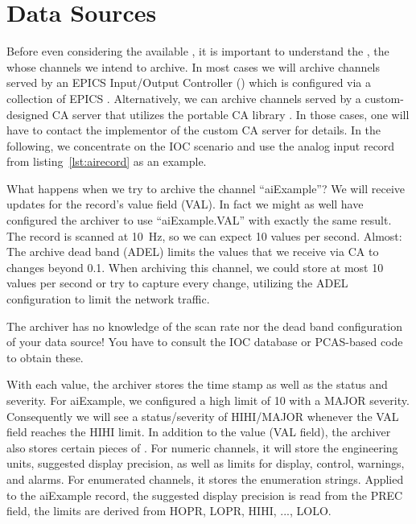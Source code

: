 \section{Data Sources} \label{sec:datasource} %
Before even considering the available , it is
important to understand the , the  whose channels we intend to archive.
In most cases we will archive channels served by an EPICS Input/Output
Controller () which is configured via a collection of EPICS
.
Alternatively, we can archive channels served by a custom-designed CA
server that utilizes the portable CA library .
In those cases, one will have to contact the implementor of the custom
CA server for details.
In the following, we concentrate on the IOC scenario and use the
analog input record from listing~\ref{lst:airecord} as an example.

 

\noindent What happens when we try to archive the channel ``aiExample''?
We will receive updates for the record's value field (VAL). In fact we
might as well have configured the archiver to use ``aiExample.VAL''
with exactly the same result.
The record is scanned at 10~Hz, so we can expect 10 values per second.
Almost: The archive dead band (ADEL) limits the values that we receive
via CA to changes beyond 0.1. When archiving this channel, we could
store at most 10 values per second or try to capture every change,
utilizing the ADEL configuration to limit the network traffic.

\NOTE The archiver has no knowledge of the scan rate nor the dead band
configuration of your data source! You have to consult the IOC
database or PCAS-based code to obtain these.

With each value, the archiver stores the time stamp as well as the
status and severity. For aiExample, we configured a high limit of 10
with a MAJOR severity. Consequently we will see a status/severity of
HIHI/MAJOR whenever the VAL field reaches the HIHI limit.
In addition to the value (VAL field), the archiver also stores certain
pieces of . For numeric channels, it will store the
engineering units, suggested display precision, as well as limits for
display, control, warnings, and alarms. For enumerated channels, it
stores the enumeration strings.
Applied to the aiExample record, the suggested display precision is
read from the PREC field, the limits are derived from HOPR, LOPR,
HIHI, ..., LOLO.

